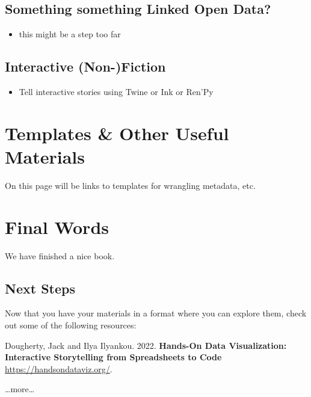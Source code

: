 \documentclass[
]{book}
\providecommand{\tightlist}{%
  \setlength{\itemsep}{0pt}\setlength{\parskip}{0pt}}
\begin{document}
\hypertarget{something-something-linked-open-data}{%
\section{Something something Linked Open Data?}\label{something-something-linked-open-data}}

\begin{itemize}
\tightlist
\item
  this might be a step too far
\end{itemize}

\hypertarget{interactive-stories}{%
\section{Interactive (Non-)Fiction}\label{interactive-stories}}

\begin{itemize}
\tightlist
\item
  Tell interactive stories using Twine or Ink or Ren'Py
\end{itemize}

\hypertarget{templates}{%
\chapter{Templates \& Other Useful Materials}\label{templates}}

On this page will be links to templates for wrangling metadata, etc.

\hypertarget{final-words}{%
\chapter{Final Words}\label{final-words}}

We have finished a nice book.

\hypertarget{next-steps}{%
\section{Next Steps}\label{next-steps}}

Now that you have your materials in a format where you can explore them, check out some of the following resources:

Dougherty, Jack and Ilya Ilyankou. 2022. \textbf{Hands-On Data Visualization: Interactive Storytelling from Spreadsheets to Code} \url{https://handsondataviz.org/}.

\ldots more\ldots{}

  
\end{document}
